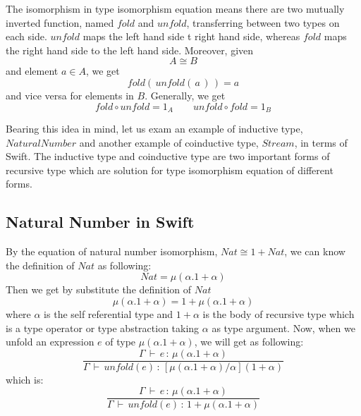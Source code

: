 \documentclass{article}
\begin{document}
The isomorphism in type isomorphism equation means there are two mutually inverted function, named $fold$ and $unfold$, transferring between two types on each side. $unfold$ maps the left hand side t right hand side, whereas $fold$ maps the right hand side to the left hand side. Moreover, given
\begin{equation*}
A \cong B
\end{equation*}
and element $a \in A$, we get
\begin{equation*}
fold(\,unfold(\,a\,)\,) = a
\end{equation*}
and vice versa for elements in $B$. Generally, we get
\begin{equation*}
fold \circ unfold = 1_{A} \qquad unfold \circ fold = 1_{B}
\end{equation*}


Bearing this idea in mind, let us exam an example of inductive type, \\ $Natural Number$ and another example of coinductive type, $Stream$, in terms of Swift. The inductive type and coinductive type are two important forms of recursive type which are solution for type isomorphism equation of different forms.

\subsection*{Natural Number in Swift}
By the equation of natural number isomorphism, $Nat \cong 1+Nat$, we can know the definition of $Nat$ as following:
\begin{equation*}
Nat = \mu(\alpha.1+\alpha)
\end{equation*}
Then we get by substitute the definition of $Nat$
\begin{equation*}
\mu(\alpha.1+\alpha) = 1 + \mu(\alpha.1+\alpha)
\end{equation*}
where $\alpha$ is the self referential type and $1+\alpha$ is the body of recursive type which is a type operator or type abstraction taking $\alpha$ as type argument.
Now, when we unfold an expression $e$ of type $\mu(\alpha.1+\alpha)$, we will get as following:
\begin{equation*}
\frac{\Gamma\,\vdash\,e\,:\,\mu(\alpha.1+\alpha)}{\Gamma\,\vdash\,unfold(e)\,:\,[\mu(\alpha.1+\alpha)/\alpha](1+\alpha)}
\end{equation*}
which is:
\begin{equation*}
\frac{\Gamma\,\vdash\,e\,:\,\mu(\alpha.1+\alpha)}{\Gamma\,\vdash\,unfold(e)\,:\,1 + \mu(\alpha.1+\alpha)}
\end{equation*}
\end{document}
